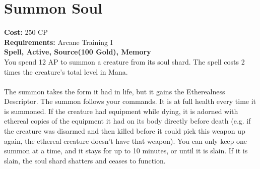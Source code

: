 \section{Summon Soul}
\textbf{Cost:} 250 CP\\
\textbf{Requirements:} Arcane Training I\\
\textbf{Spell, Active, Source(100 Gold), Memory}\\
You spend 12 AP to summon a creature from its soul shard. The spell costs 2 times the creature’s total level in Mana.\\
\\
The summon takes the form it had in life, but it gains the Etherealness Descriptor. The summon follows your commands. It is at full health every time it is summoned. If the creature had equipment while dying, it is adorned with ethereal copies of the equipment it had on its body directly before death (e.g. if the creature was disarmed and then killed before it could pick this weapon up again, the ethereal creature doesn’t have that weapon). You can only keep one summon at a time, and it stays for up to 10 minutes, or until it is slain. If it is slain, the soul shard shatters and ceases to function.\\
